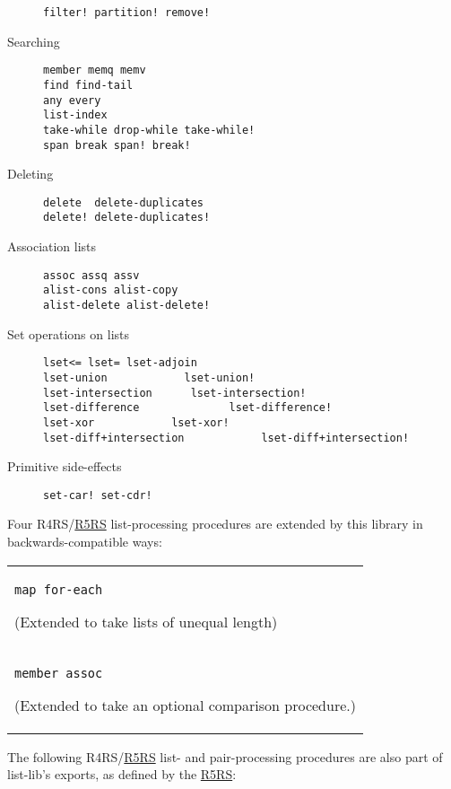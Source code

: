 \begin{description}
\begin{verbatim}
filter! partition! remove! 
\end{verbatim}
\item[ Searching ]
\begin{verbatim}
member memq memv
find find-tail 
any every
list-index
take-while drop-while take-while!
span break span! break!
\end{verbatim}
\item[ Deleting ]
\begin{verbatim}
delete  delete-duplicates 
delete! delete-duplicates!
\end{verbatim}
\item[ Association lists ]
\begin{verbatim}
assoc assq assv
alist-cons alist-copy
alist-delete alist-delete!
\end{verbatim}
\item[ Set operations on lists ]
\begin{verbatim}
lset<= lset= lset-adjoin
lset-union            lset-union!
lset-intersection      lset-intersection!
lset-difference              lset-difference!
lset-xor            lset-xor!
lset-diff+intersection            lset-diff+intersection!
\end{verbatim}
\item[ Primitive side-effects ]
\begin{verbatim}
set-car! set-cdr!
\end{verbatim}
\end{description}

Four R4RS/\protect\hyperlink{R5RS}{R5RS} list-processing procedures are
extended by this library in backwards-compatible ways:

\begin{longtable}[]{@{}l@{}}
\toprule
\begin{minipage}[t]{0.97\columnwidth}\raggedright\strut
\texttt{map\ for-each}

(Extended to take lists of unequal length)\strut
\end{minipage}\tabularnewline
\begin{minipage}[t]{0.97\columnwidth}\raggedright\strut
\texttt{member\ assoc}

(Extended to take an optional comparison procedure.)\strut
\end{minipage}\tabularnewline
\bottomrule
\end{longtable}

The following R4RS/\protect\hyperlink{R5RS}{R5RS} list- and
pair-processing procedures are also part of list-lib's exports, as
defined by the \protect\hyperlink{R5RS}{R5RS}:

